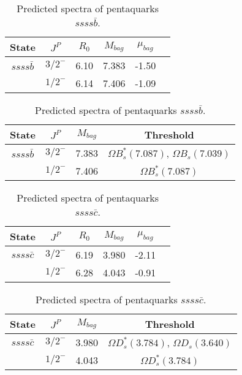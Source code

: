 \documentclass[prd,twocolumn,floatfix,nofootinbib]{revtex4}
\begin{document}
\renewcommand{\tabcolsep}{0.5cm}
\renewcommand{\arraystretch}{1.2}
\begin{table*}[!htbp]
    \caption{Predicted spectra of pentaquarks $ssss\bar{b}$.}
    \begin{tabular}{cccccc}
        \hline\hline
        {\rm State} &$J^{P}$ &$R_{0}$ &$M_{bag}$ &$\mu_{bag}$  \\ \hline
        $ssss\bar{b}$
            &${3/2}^{-}$    &6.10   &7.383  &-1.50    \\
            &${1/2}^{-}$    &6.14   &7.406  &-1.09  \\
        \hline\hline
    \end{tabular}
\end{table*}

\renewcommand{\tabcolsep}{0.5cm}
\renewcommand{\arraystretch}{1.2}
\begin{table*}[!htbp]
    \caption{Predicted spectra of pentaquarks $ssss\bar{b}$.}
    \begin{tabular}{cccc}
        \hline\hline
        {\rm State} &$J^{P}$ &$M_{bag}$ &{\rm Threshold} \\ \hline
        $ssss\bar{b}$
            &${3/2}^{-}$    &7.383 &$\Omega B^{\ast}_{s}(7.087)$, $\Omega B_{s}(7.039)$ \\
            &${1/2}^{-}$    &7.406 &$\Omega B^{\ast}_{s}(7.087)$ \\
        \hline\hline
    \end{tabular}
\end{table*}

\renewcommand{\tabcolsep}{0.5cm}
\renewcommand{\arraystretch}{1.2}
\begin{table*}[!htbp]
    \caption{Predicted spectra of pentaquarks $ssss\bar{c}$.}
    \begin{tabular}{cccccc}
        \hline\hline
        {\rm State} &$J^{P}$ &$R_{0}$ &$M_{bag}$ &$\mu_{bag}$  \\ \hline
        $ssss\bar{c}$
            &${3/2}^{-}$    &6.19   &3.980  &-2.11  \\
            &${1/2}^{-}$    &6.28   &4.043  &-0.91  \\
        \hline\hline
    \end{tabular}
\end{table*}

\renewcommand{\tabcolsep}{0.5cm}
\renewcommand{\arraystretch}{1.2}
\begin{table*}[!htbp]
    \caption{Predicted spectra of pentaquarks $ssss\bar{c}$.}
    \begin{tabular}{cccc}
        \hline\hline
        {\rm State} &$J^{P}$ &$M_{bag}$ &{\rm Threshold} \\ \hline
        $ssss\bar{c}$
            &${3/2}^{-}$    &3.980 &$\Omega D^{\ast}_{s}(3.784)$, $\Omega D_{s}(3.640)$ \\
            &${1/2}^{-}$    &4.043 &$\Omega D^{\ast}_{s}(3.784)$ \\
        \hline\hline
    \end{tabular}
\end{table*}
\end{document}
